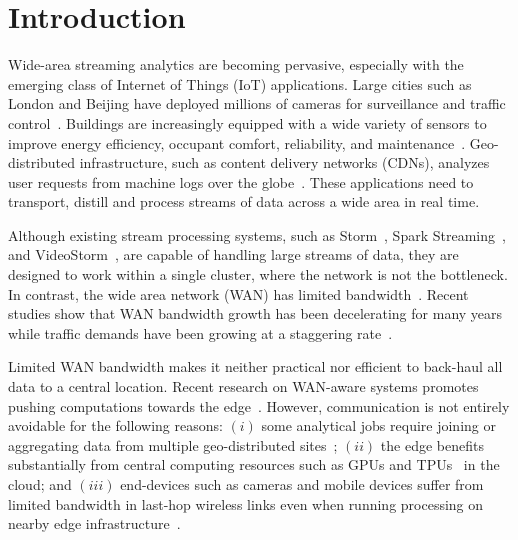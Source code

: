 \section{Introduction}

Wide-area streaming analytics are becoming pervasive, especially with the
emerging class of Internet of Things (IoT) applications.  Large cities such as
London and Beijing have deployed millions of cameras for surveillance and
traffic control~\cite{london.surveillance, skynet}. Buildings are increasingly
equipped with a wide variety of sensors to improve energy efficiency, occupant
comfort, reliability, and
maintenance~\cite{krioukov2012building}. Geo-distributed infrastructure, such as
content delivery networks (CDNs), analyzes user requests from machine logs over the
globe~\cite{mukerjee2015practical}. These applications need to transport,
distill and process streams of data across a wide area in real time.

Although existing stream processing systems, such as
Storm~\cite{toshniwal2014storm}, Spark Streaming~\cite{zaharia2013discretized},
and VideoStorm~\cite{zhang2017live}, are capable of handling large streams of
data, they are designed to work within a single cluster, where the network is
not the bottleneck.  In contrast, the wide area network (WAN) has limited
bandwidth~\cite{hsieh17gaia, vulimiri2015global}. Recent studies show that WAN
bandwidth growth has been decelerating for many
years~\cite{global2016telegeography} while traffic demands have been growing at a staggering
rate~\cite{index2013zettabyte}.

Limited WAN bandwidth makes it neither practical nor efficient to back-haul all data to a central location.
Recent research on WAN-aware systems promotes pushing computations towards the
edge~\cite{satyanarayanan2009case, rabkin2014aggregation, pu2015low}. However,
communication is not entirely avoidable for the following reasons: $(i)$ some
analytical jobs require joining or aggregating data from multiple geo-distributed
sites~\cite{pu2015low, viswanathan2016clarinet}; $(ii)$ the edge benefits
substantially from central computing resources such as GPUs and
TPUs~\cite{abadi2016tensorflow} in the cloud; and $(iii)$
end-devices such as cameras and mobile devices suffer from limited
bandwidth in last-hop wireless links even when running processing on
nearby edge infrastructure~\cite{zhang2015design, abari2017enabling}.


